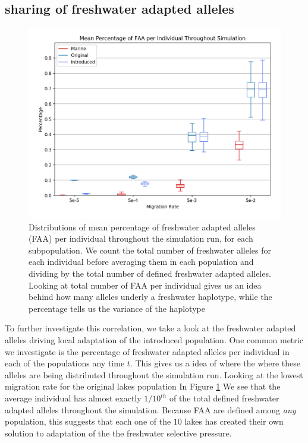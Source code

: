 \documentclass{article}
\begin{document}
 
\subsection*{sharing of freshwater adapted alleles}

\begin{figure}
	\begin{center}
  		\includegraphics[width=\linewidth]{matplotlibPlots/MPFAI.png}
  		\caption{Distributions of mean percentage of freshwater adapted alleles (FAA) per individual throughout the simulation run, for each subpopulation.
		We count the total number of freshwater alleles for each individual before averaging them in each population and dividing by the total number of defined
		freshwater adapted alleles.
		Looking at total number of FAA per individual gives us an idea behind how many alleles underly a freshwater haplotype, 
		while the percentage tells us the variance of the haplotype}
		\label{fig:MPFAI}
	\end{center}
\end{figure}

To further investigate this correlation, we take a look at the freshwater adapted alleles driving 
local adaptation of the introduced population. 
One common metric we investigate is the percentage of freshwater adapted alleles per individual in each of the populations any time $t$. 
This gives us a idea of where the where these alleles are being distributed throughout the simulation run. 
Looking at the lowest migration rate for the original lakes population In Figure \ref{fig:MPFAI}
We see that the average individual has almost exactly $1/10^{th}$ of the total defined freshwater adapted alleles throughout the simulation. 
Because FAA are defined among \textit{any} population, this suggests that each one of the $10$ 
lakes has created their own solution to adaptation of the the freshwater selective pressure. 
\end{document}
